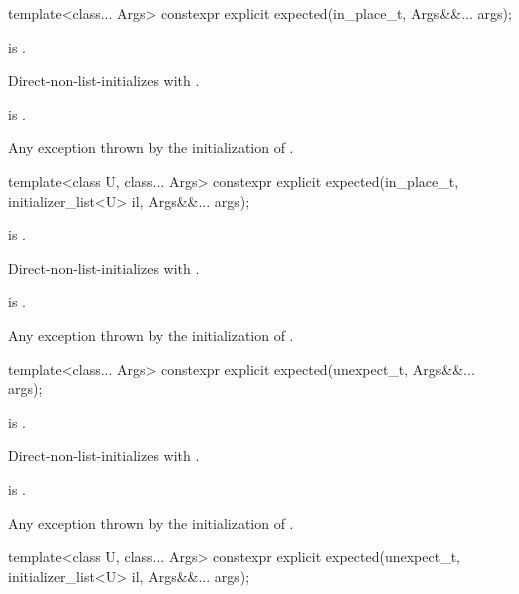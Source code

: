 %
\begin{itemdecl}
template<class... Args>
  constexpr explicit expected(in_place_t, Args&&... args);
\end{itemdecl}

\begin{itemdescr}
\pnum
\constraints
{} is .

\pnum
\effects
Direct-non-list-initializes  with .

\pnum
\ensures
{} is .

\pnum
\throws
Any exception thrown by the initialization of .
\end{itemdescr}

%
\begin{itemdecl}
template<class U, class... Args>
  constexpr explicit expected(in_place_t, initializer_list<U> il, Args&&... args);
\end{itemdecl}

\begin{itemdescr}
\pnum
\constraints
{} is .

\pnum
\effects
Direct-non-list-initializes  with
.

\pnum
\ensures
{} is .

\pnum
\throws
Any exception thrown by the initialization of .
\end{itemdescr}

%
\begin{itemdecl}
template<class... Args>
  constexpr explicit expected(unexpect_t, Args&&... args);
\end{itemdecl}

\begin{itemdescr}
\pnum
\constraints
{} is .

\pnum
\effects
Direct-non-list-initializes  with
.

\pnum
\ensures
{} is .

\pnum
\throws
Any exception thrown by the initialization of .
\end{itemdescr}

%
\begin{itemdecl}
template<class U, class... Args>
  constexpr explicit expected(unexpect_t, initializer_list<U> il, Args&&... args);
\end{itemdecl}

